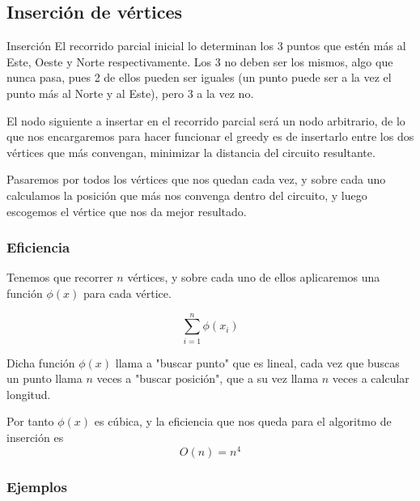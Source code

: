\subsection{Inserción de vértices}
\begin{frame}
	\begin{block}{Inserción}
El recorrido parcial inicial lo determinan los 3 puntos que estén más al Este, Oeste y Norte respectivamente. Los 3 no deben ser los mismos, algo que nunca pasa, pues 2 de ellos pueden ser iguales (un punto puede ser a la vez el punto más al Norte y al Este), pero 3 a la vez no.
	\end{block}

	\begin{block}{ }
	El nodo siguiente a insertar en el recorrido parcial será un nodo arbitrario, de lo 
	que nos encargaremos para hacer funcionar el greedy es de insertarlo entre los dos 
	vértices que más convengan, minimizar la distancia del circuito resultante.

	Pasaremos por todos los vértices que nos quedan cada vez, y sobre cada uno calculamos 
	la posición que más nos convenga dentro del circuito, y luego escogemos el vértice que 
	nos da mejor resultado.
	\end{block}
\end{frame}

\subsubsection{Eficiencia}
\begin{frame}
	\begin{block}{ }
	Tenemos que recorrer $n$ vértices, y sobre cada uno de ellos aplicaremos una función 		
	$\phi(x)$ para cada vértice.

	\[ \sum_{i=1}^{n} \phi(x_i)\]
	\end{block}
	\begin{block}{ }
	Dicha función $\phi(x)$ llama a "buscar punto" que es lineal, cada vez que buscas un 
	punto llama $n$ veces a "buscar posición", que a su vez llama $n$ veces a calcular 
	longitud.

	Por tanto $\phi(x)$ es cúbica, y la eficiencia que nos queda para el algoritmo de 
	inserción es
	\[ O(n) = n^4 \]
	\end{block}
\end{frame}

\subsubsection{Ejemplos}

